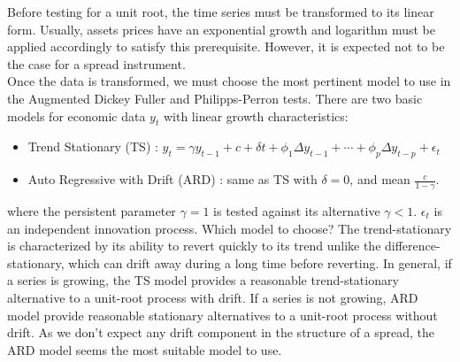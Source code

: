\documentclass[11pt,a4,twosided,singlespacing,titlepagenumber=on]{scrreprt}
\numberwithin{equation}{chapter} %
\theoremstyle{remark}
\begin{document}
Before testing for a unit root, the time series must be transformed to its linear form. Usually, assets prices have an exponential growth and logarithm must be applied accordingly to satisfy this prerequisite. However, it is expected not to be the case for a spread instrument. \\
Once the data is transformed, we must choose the most pertinent model to use in the Augmented Dickey Fuller and Philipps-Perron tests. There are two basic models for economic data $y_t$ with linear growth characteristics: 
\begin{itemize}
\item Trend Stationary (TS) : $y_t = \gamma y_{t-1} + c + \delta t + \phi_1 \Delta y_{t-1} + \cdots + \phi_p \Delta y_{t-p} + \epsilon_t $
\item Auto Regressive with Drift (ARD) : same as TS with $\delta = 0$, and mean $\frac{c}{1-\gamma}$.
\end{itemize}
where the persistent parameter $\gamma = 1$ is tested against its alternative $\gamma < 1$. $\epsilon_t$ is an independent innovation process.
\noindent
Which model to choose? The trend-stationary is characterized by its ability to revert quickly to its trend unlike the difference-stationary, which can
drift away during a long time before reverting. In general, if a series is growing, the TS model provides a reasonable trend-stationary alternative to a unit-root process with drift. If a series is not growing, ARD model provide reasonable stationary alternatives to a unit-root process without drift. As we don't expect any drift component in the structure of a spread, the ARD model seems the most suitable model to use. \\
\end{document}
